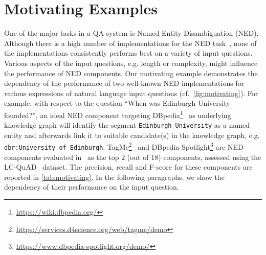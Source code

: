 \documentclass[sigconf,edbt]{acmart-edbt2019}
\newcommand{\qq}[1]{``#1''}
\begin{document}
\section{Motivating Examples} \label{sec:motivation}
One of the major tasks in a QA system is Named Entity Disambiguation (NED). 
Although there is a high number of implementations for the NED task~\cite{DBLP:conf/cikm/FerraginaS10,DBLP:conf/emnlp/HoffartYBFPSTTW11,MendesJGB11}, none of the implementations consistently performs best on a variety of input questions.
Various aspects of the input questions, e.g. length or complexity, might influence the performance of NED components.
Our motivating example demonstrates the dependency of the performance of two well-known NED implementations for various expressions of natural language input questions (cf.\ \autoref{fig:motivating}). For example, with respect to the question \qq{When was Edinburgh University founded?}, an ideal NED component targeting DBpedia\footnote{\url{https://wiki.dbpedia.org/}}~\cite{DBLP:conf/semweb/AuerBKLCI07} as underlying knowledge graph will identify the segment \texttt{Edinburgh University} as a named entity and afterwards link it to suitable candidate(s) in the knowledge graph, e.g. \texttt{dbr:University\_of\_Edinburgh}. TagMe\footnote{\url{https://services.d4science.org/web/tagme/demo}}~\cite{DBLP:conf/cikm/FerraginaS10} and DBpedia Spotlight\footnote{\url{https://www.dbpedia-spotlight.org/demo/}} \cite{MendesJGB11} are NED components evaluated in~\cite{DBLP:conf/www/SinghRBSLUVKP0V18} as the top 2 (out of 18) components, assessed using the LC-QuAD~\cite{trivedi2017lc} dataset. The precision, recall and F-score for these components are reported in \autoref{tab:motivating}. 
In the following paragraphs, we show the dependency of their performance on the input question.
\end{document}
